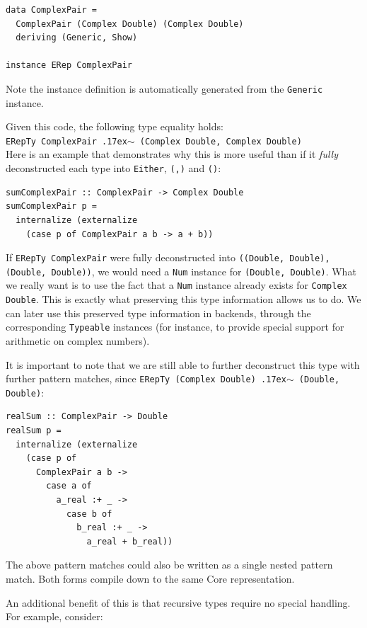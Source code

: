 \documentclass[runningheads, a4paper]{llncs}
\newcommand{\typeeq}{\raise.17ex\hbox{$\scriptstyle\mathtt{\sim}$}\,\;}
\newcommand{\ttt}{\texttt}
\begin{document}
\begin{lstlisting}
data ComplexPair =
  ComplexPair (Complex Double) (Complex Double)
  deriving (Generic, Show)

instance ERep ComplexPair
\end{lstlisting}

Note the instance definition is automatically generated from the \ttt{Generic}
instance.

Given this code, the following type equality holds:
\\

\ttt{ERepTy ComplexPair \typeeq (Complex Double, Complex Double)}
\\

Here is an example that demonstrates why this is more useful than if it \textit{fully} deconstructed
each type into \ttt{Either}, \ttt{(,)} and \ttt{()}:

\begin{lstlisting}
sumComplexPair :: ComplexPair -> Complex Double
sumComplexPair p =
  internalize (externalize
    (case p of ComplexPair a b -> a + b))
\end{lstlisting}

If \ttt{ERepTy ComplexPair} were fully deconstructed into \ttt{((Double, Double),
(Double, Double))}, we would need a \ttt{Num} instance for \ttt{(Double,
Double)}.  What we really want is to use the fact that a \ttt{Num} instance
already exists for \ttt{Complex Double}. This is exactly what preserving this
type information allows us to do. We can later use this preserved type
information in backends, through the corresponding \ttt{Typeable} instances (for
instance, to provide special support for arithmetic on complex numbers).

It is important to note that we are still able to further deconstruct this type
with further pattern matches, since \ttt{ERepTy (Complex Double) \typeeq (Double, Double)}:

\begin{lstlisting}
realSum :: ComplexPair -> Double
realSum p =
  internalize (externalize
    (case p of
      ComplexPair a b ->
        case a of
          a_real :+ _ ->
            case b of
              b_real :+ _ ->
                a_real + b_real))
\end{lstlisting}

The above pattern matches could also be written as a single nested pattern
match. Both forms compile down to the same Core representation.

An additional benefit of this is that recursive types require no special handling. For
example, consider:
\end{document}
